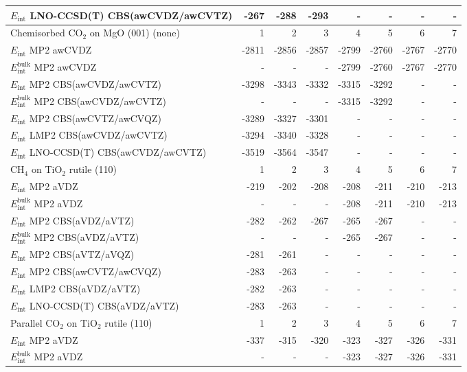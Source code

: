 \begin{longtable}{lrrrrrrr}
$E_\textrm{int}$ LNO-CCSD(T) CBS(awCVDZ/awCVTZ) & -267 & -288 & -293 & - & - & - & - \\
\toprule
Chemisorbed CO$_2$ on MgO (001) (none) & 1 & 2 & 3 & 4 & 5 & 6 & 7 \\ 
\midrule
$E_\textrm{int}$ MP2 awCVDZ & -2811 & -2856 & -2857 & -2799 & -2760 & -2767 & -2770 \\
$E_\textrm{int}^\textrm{bulk}$ MP2 awCVDZ & - & - & - & -2799 & -2760 & -2767 & -2770 \\
$E_\textrm{int}$ MP2 CBS(awCVDZ/awCVTZ) & -3298 & -3343 & -3332 & -3315 & -3292 & - & - \\
$E_\textrm{int}^\textrm{bulk}$ MP2 CBS(awCVDZ/awCVTZ) & - & - & - & -3315 & -3292 & - & - \\
$E_\textrm{int}$ MP2 CBS(awCVTZ/awCVQZ) & -3289 & -3327 & -3301 & - & - & - & - \\
$E_\textrm{int}$ LMP2 CBS(awCVDZ/awCVTZ) & -3294 & -3340 & -3328 & - & - & - & - \\
$E_\textrm{int}$ LNO-CCSD(T) CBS(awCVDZ/awCVTZ) & -3519 & -3564 & -3547 & - & - & - & - \\
\toprule
CH$_4$ on TiO$_2$ rutile (110) & 1 & 2 & 3 & 4 & 5 & 6 & 7 \\ 
\midrule
$E_\textrm{int}$ MP2 aVDZ & -219 & -202 & -208 & -208 & -211 & -210 & -213 \\
$E_\textrm{int}^\textrm{bulk}$ MP2 aVDZ & - & - & - & -208 & -211 & -210 & -213 \\
$E_\textrm{int}$ MP2 CBS(aVDZ/aVTZ) & -282 & -262 & -267 & -265 & -267 & - & - \\
$E_\textrm{int}^\textrm{bulk}$ MP2 CBS(aVDZ/aVTZ) & - & - & - & -265 & -267 & - & - \\
$E_\textrm{int}$ MP2 CBS(aVTZ/aVQZ) & -281 & -261 & - & - & - & - & - \\
$E_\textrm{int}$ MP2 CBS(awCVTZ/awCVQZ) & -283 & -263 & - & - & - & - & - \\
$E_\textrm{int}$ LMP2 CBS(aVDZ/aVTZ) & -282 & -263 & - & - & - & - & - \\
$E_\textrm{int}$ LNO-CCSD(T) CBS(aVDZ/aVTZ) & -283 & -263 & - & - & - & - & - \\
\toprule
Parallel CO$_2$ on TiO$_2$ rutile (110) & 1 & 2 & 3 & 4 & 5 & 6 & 7 \\ 
\midrule
$E_\textrm{int}$ MP2 aVDZ & -337 & -315 & -320 & -323 & -327 & -326 & -331 \\
$E_\textrm{int}^\textrm{bulk}$ MP2 aVDZ & - & - & - & -323 & -327 & -326 & -331 \\

\end{longtable}
